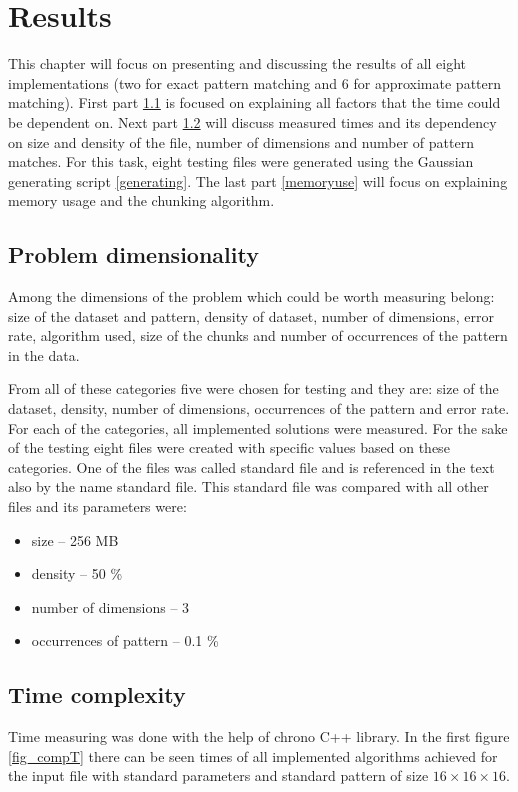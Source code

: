 \chapter{Results}
This chapter will focus on presenting and discussing the results of all eight implementations (two for exact pattern matching and 6 for approximate pattern matching). First part \ref{problemdim} is focused on explaining all factors that the time could be dependent on. Next part \ref{timecomplex} will discuss measured times and its dependency on size and density of the file, number of dimensions and number of pattern matches. For this task, eight testing files were generated using the Gaussian generating script \ref{generating}. The last part \ref{memoryuse} will focus on explaining memory usage and the chunking algorithm.

\section{Problem dimensionality} \label{problemdim}
Among the dimensions of the problem which could be worth measuring belong: size of the dataset and pattern, density of dataset, number of dimensions, error rate, algorithm used, size of the chunks and number of occurrences of the pattern in the data.

From all of these categories five were chosen for testing and they are: size of the dataset, density, number of dimensions, occurrences of the pattern and error rate. For each of the categories, all implemented solutions were measured. For the sake of the testing eight files were created with specific values based on these categories. One of the files was called standard file and is referenced in the text also by the name standard file. This standard file was compared with all other files and its parameters were: 
\begin{itemize}
\item size -- 256 MB
\item density -- 50 \%
\item number of dimensions -- 3
\item occurrences of pattern -- 0.1 \%
\end{itemize}

\section{Time complexity} \label{timecomplex}
Time measuring was done with the help of chrono C++ library. In the first figure \ref{fig_compT} there can be seen times of all implemented algorithms achieved for the input file with standard parameters and standard pattern of size $16\times16\times16$. 

